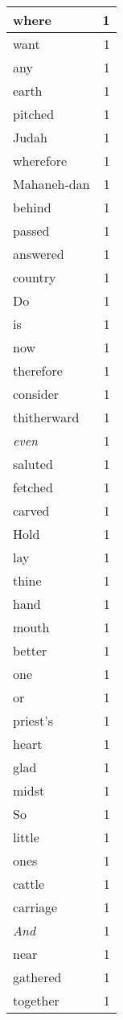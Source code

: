 \begin{center}
\begin{longtable}{l|r}
where & 1\\ \hline 
want & 1\\ \hline 
any & 1\\ \hline 
earth & 1\\ \hline 
pitched & 1\\ \hline 
Judah & 1\\ \hline 
wherefore & 1\\ \hline 
Mahaneh-dan & 1\\ \hline 
behind & 1\\ \hline 
passed & 1\\ \hline 
answered & 1\\ \hline 
country & 1\\ \hline 
Do & 1\\ \hline 
is & 1\\ \hline 
now & 1\\ \hline 
therefore & 1\\ \hline 
consider & 1\\ \hline 
thitherward & 1\\ \hline 
\emph{even} & 1\\ \hline 
saluted & 1\\ \hline 
fetched & 1\\ \hline 
carved & 1\\ \hline 
Hold & 1\\ \hline 
lay & 1\\ \hline 
thine & 1\\ \hline 
hand & 1\\ \hline 
mouth & 1\\ \hline 
better & 1\\ \hline 
one & 1\\ \hline 
or & 1\\ \hline 
priest's & 1\\ \hline 
heart & 1\\ \hline 
glad & 1\\ \hline 
midst & 1\\ \hline 
So & 1\\ \hline 
little & 1\\ \hline 
ones & 1\\ \hline 
cattle & 1\\ \hline 
carriage & 1\\ \hline 
\emph{And} & 1\\ \hline 
near & 1\\ \hline 
gathered & 1\\ \hline 
together & 1\\ \hline 

\end{longtable}
\end{center}
